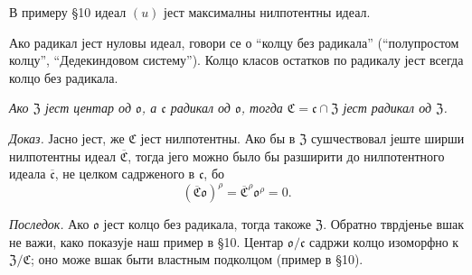 ﻿\documentclass[11pt]{article}
\providecommand{\mc}{\mathfrak{c}}
\providecommand{\mC}{\mathfrak{C}}
\providecommand{\mZ}{\mathfrak{Z}}
\providecommand{\mo}{\mathfrak{o}}
\begin{document}
В примеру §10 идеал $(u)$ јест максималны нилпотентны идеал.

Ако радикал јест нуловы идеал, говори се о “колцу без радикала” (“полупростом колцу”, “Дедекиндовом систему”). Колцо класов остатков по радикалу јест всегда колцо без радикала.

\emph{Ако $\mZ$ јест центар од $\mo$, а $\mc$ радикал од $\mo$, тогда $\mC=\mc\cap\mZ$ јест радикал од $\mZ$.}

\emph{Доказ.} Јасно јест, же $\mC$ јест нилпотентны. Ако бы в $\mZ$ сушчествовал јеште ширши нилпотентны идеал $\overline{\mC}$, тогда јего можно было бы разширити до нилпотентного идеала $\overline{\mc}$, не целком садрженого в $\mc$, бо
\[
        (\overline{\mC}\mo)^\rho=\overline{\mC}^{\rho}\mo^\rho=0.
\]

\emph{Последок.} Ако $\mo$ јест колцо без радикала, тогда такоже $\mZ$. Обратно тврдјенье вшак не важи, како показује наш пример в §10. Центар $\mo/\mc$ садржи колцо изоморфно к $\mZ/\mC$; оно може вшак быти властным подколцом (пример в §10).
\end{document}

